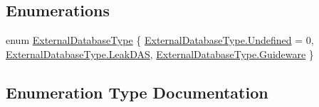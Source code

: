 \subsection*{Enumerations}
\begin{DoxyCompactItemize}
\item 
enum \hyperlink{namespace_env_int_1_1_win32_1_1_field_tech_1_1_manager_adbf685b712e369479332f63a4c3c7690}{External\+Database\+Type} \{ \hyperlink{namespace_env_int_1_1_win32_1_1_field_tech_1_1_manager_adbf685b712e369479332f63a4c3c7690aec0fc0100c4fc1ce4eea230c3dc10360}{External\+Database\+Type.\+Undefined} = 0, 
\hyperlink{namespace_env_int_1_1_win32_1_1_field_tech_1_1_manager_adbf685b712e369479332f63a4c3c7690adaf1390e5c18ed62d47a04d0285ad6e8}{External\+Database\+Type.\+Leak\+D\+A\+S}, 
\hyperlink{namespace_env_int_1_1_win32_1_1_field_tech_1_1_manager_adbf685b712e369479332f63a4c3c7690aec3c11760b378eef4c5b9602e34e349d}{External\+Database\+Type.\+Guideware}
 \}
\end{DoxyCompactItemize}


\subsection{Enumeration Type Documentation}
\hypertarget{namespace_env_int_1_1_win32_1_1_field_tech_1_1_manager_adbf685b712e369479332f63a4c3c7690}{}
